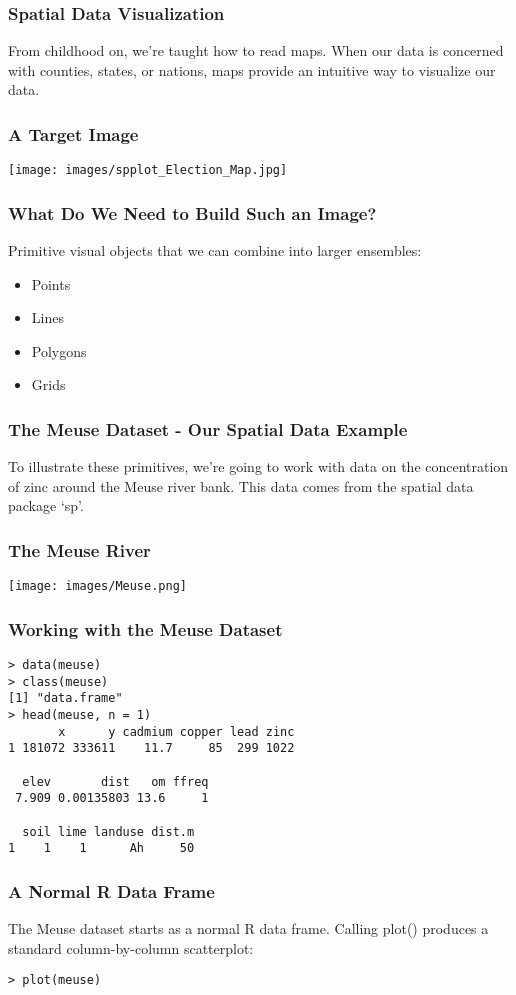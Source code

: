 \documentclass{beamer}
\begin{document}
\frame
{
	\frametitle{Spatial Data Visualization}
	
	From childhood on, we're taught how to read maps. When our data is concerned with counties, states, or nations, maps provide an intuitive way to visualize our data.
}

\frame
{
	\frametitle{A Target Image}
	
	\begin{center}
		\texttt{[image: images/spplot\_Election\_Map.jpg]}
	\end{center}
}

\frame
{
	\frametitle{What Do We Need to Build Such an Image?}
	
	Primitive visual objects that we can combine into larger ensembles:
	\begin{itemize}
		\item<1->{Points}
		\item<2->{Lines}
		\item<3->{Polygons}
		\item<4->{Grids}
	\end{itemize}	
}

\frame
{
	\frametitle{The Meuse Dataset - Our Spatial Data Example}

	To illustrate these primitives, we're going to work with data on the concentration of zinc  around the Meuse river bank. This data comes from the spatial data package `sp'.
}

\frame
{
	\frametitle{The Meuse River}

	\begin{center}
		\texttt{[image: images/Meuse.png]}
	\end{center}
}

\begin{frame}[fragile]
	\frametitle{Working with the Meuse Dataset}
	\begin{verbatim}
> data(meuse)
> class(meuse)
[1] "data.frame"
> head(meuse, n = 1)
       x      y cadmium copper lead zinc
1 181072 333611    11.7     85  299 1022

  elev       dist   om ffreq
 7.909 0.00135803 13.6     1

  soil lime landuse dist.m
1    1    1      Ah     50
	\end{verbatim}
\end{frame}

\begin{frame}[fragile]
	\frametitle{A Normal R Data Frame}
	
	The Meuse dataset starts as a normal R data frame. Calling plot() produces a standard column-by-column scatterplot:
	
	\begin{verbatim}
> plot(meuse)
	\end{verbatim}
\end{frame}
\end{document}
